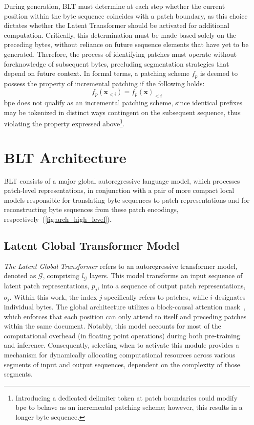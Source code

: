 During generation, {\textsc BLT} must determine at each step whether the current position within the byte sequence coincides with a patch boundary, as this choice dictates whether the Latent Transformer should be activated for additional computation. Critically, this determination must be made based solely on the preceding bytes, without reliance on future sequence elements that have yet to be generated. Therefore, the process of identifying patches must operate without foreknowledge of subsequent bytes, precluding segmentation strategies that depend on future context. In formal terms, a patching scheme $f_p$ is deemed to possess the property of incremental patching if the following holds:
$$f_p(\pmb{x}_{<i}) = f_p(\pmb{x})_{<i}$$
bpe does not qualify as an incremental patching scheme, since identical prefixes may be tokenized in distinct ways contingent on the subsequent sequence, thus violating the property expressed above\footnote{Introducing a dedicated delimiter token at patch boundaries could modify bpe to behave as an incremental patching scheme; however, this results in a longer byte sequence.}.

\section{{\textsc BLT} Architecture}
\label{section:architecture}
{\textsc BLT} consists of a major global autoregressive language model, which processes patch-level representations, in conjunction with a pair of more compact local models responsible for translating byte sequences to patch representations and for reconstructing byte sequences from these patch encodings, respectively~(\autoref{fig:arch_high_level}).

\subsection{Latent Global Transformer Model}

\textit{The Latent Global Transformer} refers to an autoregressive transformer model, denoted as $\mathcal{G}$, comprising $l_{\mathcal{G}}$ layers. This model transforms an input sequence of latent patch representations, $p_j$, into a sequence of output patch representations, $o_j$. Within this work, the index $j$ specifically refers to patches, while $i$ designates individual bytes. The global architecture utilizes a block-causal attention mask~\citep{dubey2024llama}, which enforces that each position can only attend to itself and preceding patches within the same document. Notably, this model accounts for most of the computational overhead (in floating point operations) during both pre-training and inference. Consequently, selecting when to activate this module provides a mechanism for dynamically allocating computational resources across various segments of input and output sequences, dependent on the complexity of those segments.

